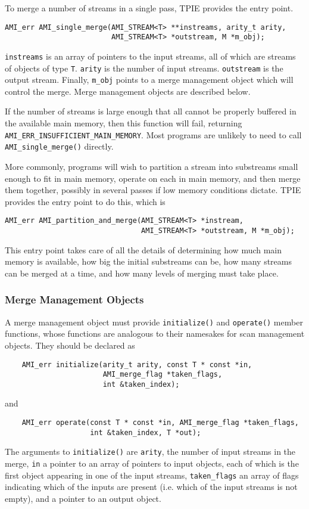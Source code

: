 To merge a number of streams in a single pass, TPIE provides the entry
point.

\begin{verbatim}
AMI_err AMI_single_merge(AMI_STREAM<T> **instreams, arity_t arity,
                         AMI_STREAM<T> *outstream, M *m_obj);
\end{verbatim}

\verb|instreams| is an array of pointers to the input streams, all of
which are streams of objects of type \verb|T|.  \verb|arity| is the
number of input streams.  \verb|outstream| is the output stream.
Finally, \verb|m_obj| points to a merge management object which will
control the merge.  Merge management objects are described below.
 
If the number of streams is large enough that all cannot be properly
buffered in the available main memory, then this function will fail,
returning \verb|AMI_ERR_INSUFFICIENT_MAIN_MEMORY|.  Most programs are
unlikely to need to call \verb|AMI_single_merge()| directly.  

More commonly, programs will wish to partition a stream into
substreams small enough to fit in main memory, operate on each in main
memory, and then merge them together, possibly in several passes if
low memory conditions dictate.  TPIE provides the entry point to do
this, which is
\begin{verbatim}
AMI_err AMI_partition_and_merge(AMI_STREAM<T> *instream,
                                AMI_STREAM<T> *outstream, M *m_obj);
\end{verbatim}
This entry point takes care of all the details of determining how much
main memory is available, how big the initial substreams can be, how
many streams can be merged at a time, and how many levels of merging
must take place.

\subsubsection{Merge Management Objects}  
 A merge management object
must provide \verb|initialize()| and \verb|operate()| member
functions, whose functions are analogous to their namesakes for scan
management objects.  They should be declared as
\begin{verbatim}
    AMI_err initialize(arity_t arity, const T * const *in,
                       AMI_merge_flag *taken_flags,
                       int &taken_index);
\end{verbatim}
and
\begin{verbatim}
    AMI_err operate(const T * const *in, AMI_merge_flag *taken_flags,
                    int &taken_index, T *out);
\end{verbatim}
The arguments to \verb|initialize()| are \verb|arity|, the number of
input streams in the merge, \verb|in| a pointer to an array of
pointers to input objects, each of which is the first object appearing
in one of the input streams,  \verb|taken_flags| an array of flags
indicating which of the inputs are present (i.e. which of the input
streams is not empty), and a pointer to an output object.

